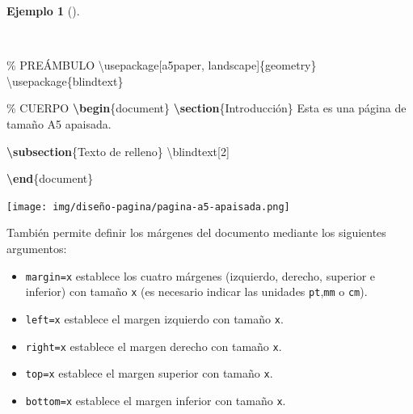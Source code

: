 \documentclass[
  a4paper,
]{scrreport}
\newenvironment{Shaded}{\begin{snugshade}}{\end{snugshade}}
\newcommand{\BuiltInTok}[1]{\textcolor[rgb]{0.00,0.23,0.31}{#1}}
\newcommand{\CommentTok}[1]{\textcolor[rgb]{0.37,0.37,0.37}{#1}}
\newcommand{\ExtensionTok}[1]{\textcolor[rgb]{0.00,0.23,0.31}{#1}}
\newcommand{\FunctionTok}[1]{\textcolor[rgb]{0.28,0.35,0.67}{#1}}
\newcommand{\KeywordTok}[1]{\textcolor[rgb]{0.00,0.23,0.31}{\textbf{#1}}}
\newcommand{\NormalTok}[1]{\textcolor[rgb]{0.00,0.23,0.31}{#1}}
\providecommand{\tightlist}{%
  \setlength{\itemsep}{0pt}\setlength{\parskip}{0pt}}\usepackage{longtable,booktabs,array}
\theoremstyle{definition}
\newtheorem{example}{Ejemplo}[chapter]
\theoremstyle{remark}
\begin{document}
\begin{example}[]\protect\hypertarget{exm-pagina-a5-apaisada}{}\label{exm-pagina-a5-apaisada}

~

\begin{Shaded}
\begin{Highlighting}[]
\CommentTok{\% PREÁMBULO}
\BuiltInTok{\textbackslash{}usepackage}\NormalTok{[a5paper, landscape]\{}\ExtensionTok{geometry}\NormalTok{\}}
\BuiltInTok{\textbackslash{}usepackage}\NormalTok{\{}\ExtensionTok{blindtext}\NormalTok{\}}

\CommentTok{\% CUERPO}
\KeywordTok{\textbackslash{}begin}\NormalTok{\{}\ExtensionTok{document}\NormalTok{\}}
\KeywordTok{\textbackslash{}section}\NormalTok{\{Introducción\}}
\NormalTok{Esta es una página de tamaño A5 apaisada.}

\KeywordTok{\textbackslash{}subsection}\NormalTok{\{Texto de relleno\}}
\FunctionTok{\textbackslash{}blindtext}\NormalTok{[2]}

\KeywordTok{\textbackslash{}end}\NormalTok{\{}\ExtensionTok{document}\NormalTok{\}}
\end{Highlighting}
\end{Shaded}

\begin{tcolorbox}[enhanced jigsaw, colframe=quarto-callout-note-color-frame, opacityback=0, title={Salida}, bottomrule=.15mm, left=2mm, coltitle=black, arc=.35mm, leftrule=.75mm, colback=white, rightrule=.15mm, colbacktitle=quarto-callout-note-color!10!white, toprule=.15mm, breakable, opacitybacktitle=0.6, bottomtitle=1mm, toptitle=1mm, titlerule=0mm]

\texttt{[image: img/diseño-pagina/pagina-a5-apaisada.png]}

\end{tcolorbox}

\end{example}

También permite definir los márgenes del documento mediante los
siguientes argumentos:

\begin{itemize}
\tightlist
\item
  \texttt{margin=x} establece los cuatro márgenes (izquierdo, derecho,
  superior e inferior) con tamaño \texttt{x} (es necesario indicar las
  unidades \texttt{pt},\texttt{mm} o \texttt{cm}).
\item
  \texttt{left=x} establece el margen izquierdo con tamaño \texttt{x}.
\item
  \texttt{right=x} establece el margen derecho con tamaño \texttt{x}.
\item
  \texttt{top=x} establece el margen superior con tamaño \texttt{x}.
\item
  \texttt{bottom=x} establece el margen inferior con tamaño \texttt{x}.
\end{itemize}
\end{document}
